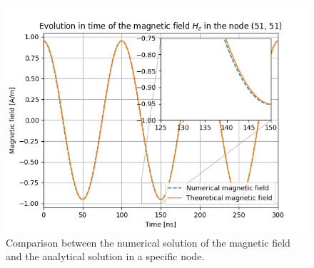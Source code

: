 \documentclass[12pt, oneside]{book}
\begin{document}
\begin{figure}[H]
    \centering
    \includegraphics[scale=0.8]{Imagenes/CFDTD2D_ResonantRectangularCavity_NodeEvolution_Comparison.png}
    \caption{Comparison between the numerical solution of the magnetic field and the analytical solution in a specific node.}
    \label{fig:CFDTD2D_RectangularResonantCavity_NodeEvolution}
\end{figure}

\begin{table}[H]
    \centering
    \caption{Comparison between the numerical and theoretical period of diverse modes of a square resonant cavity defined by the nodes $(10.5,10.5)$, $(95.5,10.5)$, $(95.5, 95.5)$ and $(10.5, 95.5)$ for the CFDTD method and $(11,11)$, $(96,11)$, $(96, 96)$ and $(11, 96)$ for the FDTD method.}
    \label{tab:PeriodComparison}
    \end{table}
\end{document}
